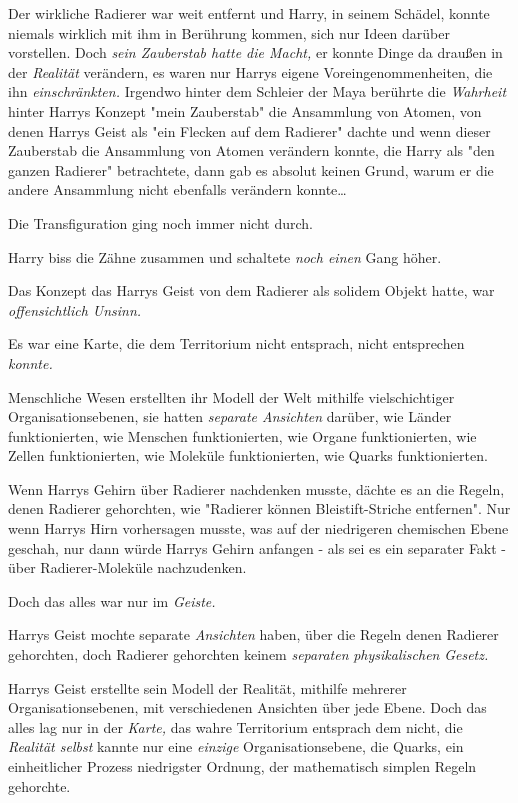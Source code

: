 {Der wirkliche Radierer war weit entfernt und Harry, in seinem Schädel, konnte niemals wirklich mit ihm in Berührung kommen, sich nur Ideen darüber vorstellen. Doch \emph{sein Zauberstab hatte die Macht,} er konnte Dinge da draußen in der \emph{Realität} verändern, es waren nur Harrys eigene Voreingenommenheiten, die ihn \emph{einschränkten.} Irgendwo hinter dem Schleier der Maya berührte die \emph{Wahrheit} hinter Harrys Konzept "mein Zauberstab" die Ansammlung von Atomen, von denen Harrys Geist als "ein Flecken auf dem Radierer" dachte und wenn dieser Zauberstab die Ansammlung von Atomen verändern konnte, die Harry als "den ganzen Radierer" betrachtete, dann gab es absolut keinen Grund, warum er die andere Ansammlung nicht ebenfalls verändern konnte…

Die Transfiguration ging noch immer nicht durch.

Harry biss die Zähne zusammen und schaltete \emph{noch einen} Gang höher.

Das Konzept das Harrys Geist von dem Radierer als solidem Objekt hatte, war \emph{offensichtlich Unsinn.}

Es war eine Karte, die dem Territorium nicht entsprach, nicht entsprechen \emph{konnte.}

Menschliche Wesen erstellten ihr Modell der Welt mithilfe vielschichtiger Organisationsebenen, sie hatten \emph{separate Ansichten} darüber, wie Länder funktionierten, wie Menschen funktionierten, wie Organe funktionierten, wie Zellen funktionierten, wie Moleküle funktionierten, wie Quarks funktionierten.

Wenn Harrys Gehirn über Radierer nachdenken musste, dächte es an die Regeln, denen Radierer gehorchten, wie "Radierer können Bleistift-Striche entfernen". Nur wenn Harrys Hirn vorhersagen musste, was auf der niedrigeren chemischen Ebene geschah, nur dann würde Harrys Gehirn anfangen - als sei es ein separater Fakt - über Radierer-Moleküle nachzudenken.

Doch das alles war nur im \emph{Geiste.}

Harrys Geist mochte separate \emph{Ansichten} haben, über die Regeln denen Radierer gehorchten, doch Radierer gehorchten keinem \emph{separaten} \emph{physikalischen} \emph{Gesetz.}

Harrys Geist erstellte sein Modell der Realität, mithilfe mehrerer Organisationsebenen, mit verschiedenen Ansichten über jede Ebene. Doch das alles lag nur in der \emph{Karte,} das wahre Territorium entsprach dem nicht, die \emph{Realität selbst} kannte nur eine \emph{einzige} Organisationsebene, die Quarks, ein einheitlicher Prozess niedrigster Ordnung, der mathematisch simplen Regeln gehorchte.

}
